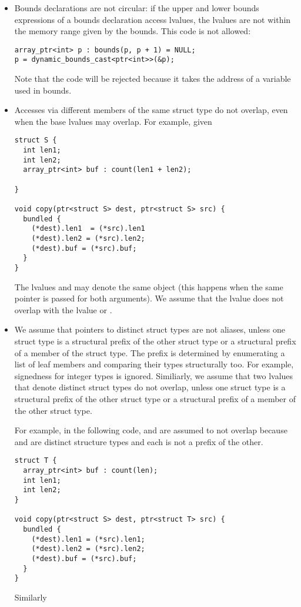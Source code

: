 \begin{itemize}
\item Bounds declarations are not circular: if the upper and lower bounds expressions of a
bounds declaration access lvalues, the lvalues are not within the memory range given
by the bounds. This code is not allowed:
\begin{lstlisting}
array_ptr<int> p : bounds(p, p + 1) = NULL;
p = dynamic_bounds_cast<ptr<int>>(&p);
\end{lstlisting}
Note that the code will be rejected because it takes the address of a variable used in bounds.
\item Accesses via different members of the same struct type do not overlap, even
when the base lvalues may overlap.  For example, given
\begin{lstlisting}
struct S {
  int len1;
  int len2;
  array_ptr<int> buf : count(len1 + len2);

}

void copy(ptr<struct S> dest, ptr<struct S> src) {
  bundled {
    (*dest).len1  = (*src).len1
    (*dest).len2 = (*src).len2;
    (*dest).buf = (*src).buf;
  }
}
\end{lstlisting}
The lvalues  and  may denote the same object (this happens when the
same pointer is passed for both arguments). We assume that the lvalue 
does not overlap with the lvalue  or .
\item We assume that pointers to distinct struct types are not aliases, unless one
struct type is a structural prefix of the other struct type or a structural prefix
of a member of the struct type.
The prefix is determined by enumerating a list of leaf members
and comparing their types structurally too.  For example, signedness
for integer types is ignored.
Similiarly, we assume that two lvalues that denote distinct struct types do not overlap,
unless one struct type is a structural prefix of the other struct type or a structural prefix of
a member of the other struct type.
  
For example, in the following code,
 and  are assumed to not overlap because  and 
are distinct structure types and each is not a prefix of the other.
\begin{lstlisting}
struct T {
  array_ptr<int> buf : count(len);
  int len1;
  int len2;
}

void copy(ptr<struct S> dest, ptr<struct T> src) {
  bundled {
    (*dest).len1 = (*src).len1;
    (*dest).len2 = (*src).len2;
    (*dest).buf = (*src).buf;
  }
}
\end{lstlisting}
Similarly 


\end{itemize}
